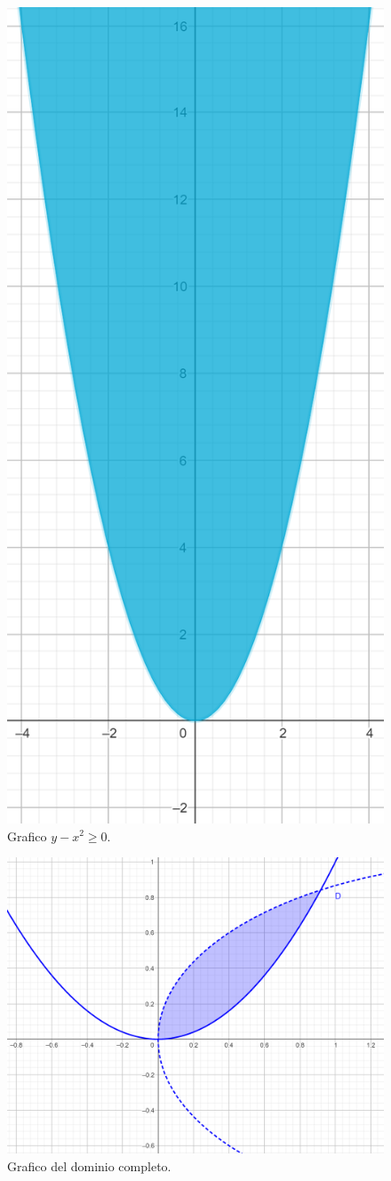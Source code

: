 \documentclass[a4paper]{article}
\begin{document}
	\begin{figure}[!htp]
		\centering
		\includegraphics[width=.6\textwidth]{img/grafico-ex3-2.png}
		\caption*{Grafico $y-x^{2} \ge 0$.}
	\end{figure}\newpage
	
	\begin{figure}[!htp]
		\centering
		\includegraphics[width=\textwidth]{img/grafico-ex3-3.png}
		\caption*{Grafico del dominio completo.}
	\end{figure}\newpage
\end{document}

